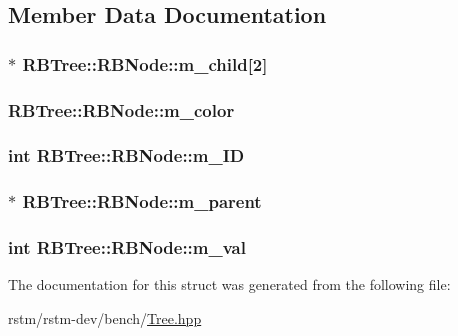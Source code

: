 \subsection{Member Data Documentation}
\hypertarget{structRBTree_1_1RBNode_a286c1d1f423f1f24aa1b771dd97ecbca}{
\subsubsection[{m\-\_\-child}]{$\ast$ R\-B\-Tree\-::\-R\-B\-Node\-::m\-\_\-child\mbox{[}2\mbox{]}}}\label{structRBTree_1_1RBNode_a286c1d1f423f1f24aa1b771dd97ecbca}
\hypertarget{structRBTree_1_1RBNode_a7f0d2fe128a3f160817657ba5022c9be}{
\subsubsection[{m\-\_\-color}]{ R\-B\-Tree\-::\-R\-B\-Node\-::m\-\_\-color}}\label{structRBTree_1_1RBNode_a7f0d2fe128a3f160817657ba5022c9be}
\hypertarget{structRBTree_1_1RBNode_ae3dfa424e34704084a5efa764f027e9d}{
\subsubsection[{m\-\_\-\-I\-D}]{\setlength{\rightskip}{0pt plus 5cm}int R\-B\-Tree\-::\-R\-B\-Node\-::m\-\_\-\-I\-D}}\label{structRBTree_1_1RBNode_ae3dfa424e34704084a5efa764f027e9d}
\hypertarget{structRBTree_1_1RBNode_ab4a913410879c9c2783ec6b791602a4b}{
\subsubsection[{m\-\_\-parent}]{$\ast$ R\-B\-Tree\-::\-R\-B\-Node\-::m\-\_\-parent}}\label{structRBTree_1_1RBNode_ab4a913410879c9c2783ec6b791602a4b}
\hypertarget{structRBTree_1_1RBNode_a365c64f6d44d54647f4c022c949a463c}{
\subsubsection[{m\-\_\-val}]{\setlength{\rightskip}{0pt plus 5cm}int R\-B\-Tree\-::\-R\-B\-Node\-::m\-\_\-val}}\label{structRBTree_1_1RBNode_a365c64f6d44d54647f4c022c949a463c}


The documentation for this struct was generated from the following file\-:\begin{DoxyCompactItemize}
\item 
rstm/rstm-\/dev/bench/\hyperlink{Tree_8hpp}{Tree.\-hpp}\end{DoxyCompactItemize}
